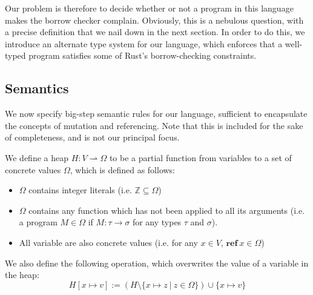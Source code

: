 \documentclass{article}
\newcommand{\mkref}{\textbf{ref}~}
\newcommand{\parfun}{\rightharpoonup}
\begin{document}
Our problem is therefore to decide whether or not a program in this language makes the borrow checker complain. Obviously, this is a nebulous question, with a precise definition that we nail down in the next section. In order to do this, we introduce an alternate type system for our language, which enforces that a well-typed program satisfies some of Rust's borrow-checking constraints.


\subsection{Semantics}

We now specify big-step semantic rules for our language, sufficient to encapsulate the concepts of mutation and referencing. Note that this is included for the sake of completeness, and is not our principal focus.

We define a heap $H : V \parfun \Omega$ to be a partial function from variables to a set of concrete values $\Omega$, which is defined as follows: 
\begin{itemize}
    \item $\Omega$ contains integer literals (i.e. $\mathbb{Z} \subseteq \Omega$)
    \item $\Omega$ contains any function which has not been applied to all its arguments (i.e. a program $M \in \Omega$ if $M : \tau \rightarrow \sigma$ for any types $\tau$ and $\sigma$).
    \item All variable are also concrete values (i.e. for any  $x \in V$, $\mkref x \in \Omega$) %
\end{itemize}
We also define the following operation, which overwrites the value of a variable in the heap: 
\begin{equation*}
    H [x \mapsto v] := (H \setminus \{x \mapsto z ~|~ z \in \Omega \} ) \cup \{x \mapsto v\} 
\end{equation*}
\end{document}
